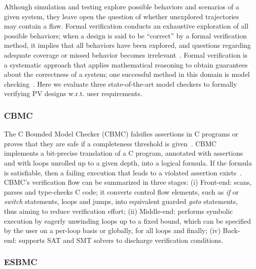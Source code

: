 \documentclass[review]{elsarticle}
\begin{document}
Although simulation and testing explore possible behaviors and scenarios of a given system, 
they leave open the question of whether unexplored trajectories may contain a flaw. 
Formal verification conducts an exhaustive exploration of all possible behaviors; 
when a design is said to be ``correct'' by a formal verification method, it implies that all 
behaviors have been explored, and questions regarding adequate coverage or missed behavior 
becomes irrelevant~\cite{Clarke2012}. Formal verification is a systematic approach that 
applies mathematical reasoning to obtain guarantees about the correctness of a system; 
one successful method in this domain is model checking~\cite{Clarke2012}. 
Here we evaluate three state-of-the-art model checkers to formally verifying PV designs w.r.t. user requirements.

\subsubsection{CBMC}

The C Bounded Model Checker (CBMC) falsifies assertions in C programs 
or proves that they are safe if a completeness threshold is given~\cite{Kroening}. 
CBMC implements a bit-precise translation of a C program, annotated with assertions 
and with loops unrolled up to a given depth, into a logical formula. If the formula is satisfiable, 
then a failing execution that leads to a violated assertion exists~\cite{Kroening}. CBMC's verification 
flow can be summarized in three stages: (i) Front-end: scans, parses and type-checks C code; 
it converts control flow elements, such as \textit{if} or \textit{switch} statements, loops and jumps, 
into equivalent guarded \textit{goto} statements, thus aiming to reduce verification effort; 
(ii) Middle-end: performs symbolic execution by eagerly unwinding loops up to a fixed bound, 
which can be specified by the user on a per-loop basis or globally, for all loops and finally; 
(iv) Back-end: supports SAT and SMT solvers to discharge verification conditions.

\subsubsection{ESBMC}
\end{document}
